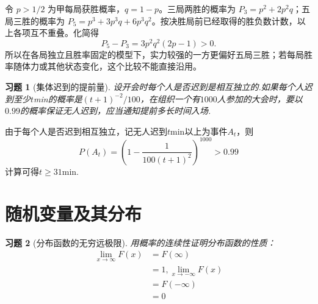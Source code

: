 \documentclass[12pt,fontset=fandol]{ctexart}
\newtheorem{exercise}{习题}[section]
\begin{document}
\begin{solve}\label{a:Y2.33}令 $p>1/2$ 为甲每局获胜概率，$q=1-p$。三局两胜的概率为 $P_3=p^2+2p^2q$；五局三胜的概率为 $P_5=p^3+3p^3q+6p^3q^2$。按决胜局前已经取得的胜负数计数，以上各项互不重叠。化简得\[P_5-P_3=3p^2q^2(2p-1)>0.\]所以在各局独立且胜率固定的模型下，实力较强的一方更偏好五局三胜；若每局胜率随体力或其他状态变化，这个比较不能直接沿用。\end{solve}

\begin{exercise}[集体迟到的提前量]\label{q:Y2.34}
设开会时每个人是否迟到是相互独立的.如果每个人迟到至少$t$min的概率是$(t+1)^{-2}/100$，在组织一个有$1000$人参加的大会时，要以$0.99$的概率保证无人迟到，应当通知提前多长时间入场.\par{}
\end{exercise}

\begin{solve}\label{a:Y2.34}
由于每个人是否迟到相互独立，记无人迟到$t$min以上为事件$A_t$，则
\[P({A_t}) = {(1 - \frac{1}{{100{{(t + 1)}^2}}})^{1000}} > 0.99\]
计算可得$t\geqslant 31$min.
\end{solve}

\clearpage\section{随机变量及其分布}

\begin{exercise}[分布函数的无穷远极限]\label{q:Y3.1}
用概率的连续性证明分布函数的性质：
\[\begin{aligned}\mathop {\lim }\limits_{x \to \infty } F(x) &= F(\infty ) \\&= 1,\mathop {\lim }\limits_{x \to  - \infty } F(x) \\&= F( - \infty ) \\&= 0\end{aligned}\]\par{}
\end{exercise}
\end{document}
